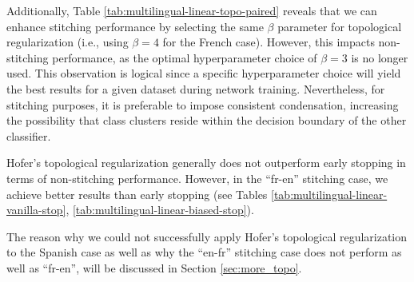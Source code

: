 \documentclass[../main.tex]{subfiles}
\begin{document}
\begin{table}[ht!]
\centering
{}
\caption{Topological reg. w/ matched params (over two random seeds)}
\label{tab:multilingual-linear-topo-paired}
\end{table}

Additionally, Table \ref{tab:multilingual-linear-topo-paired} reveals that we can enhance stitching performance by selecting the same $\beta$ parameter for topological regularization (i.e., using $\beta=4$ for the French case). However, this impacts non-stitching performance, as the optimal hyperparameter choice of $\beta=3$ is no longer used. This observation is logical since a specific hyperparameter choice will yield the best results for a given dataset during network training. Nevertheless, for stitching purposes, it is preferable to impose consistent condensation, increasing the possibility that class clusters reside within the decision boundary of the other classifier.

\begin{mathNote}
Hofer's topological regularization generally does not outperform early stopping in terms of non-stitching performance. However, in the ``fr-en'' stitching case, we achieve better results than early stopping (see Tables \ref{tab:multilingual-linear-vanilla-stop}, \ref{tab:multilingual-linear-biased-stop}).
\end{mathNote}

The reason why we could not successfully apply Hofer's topological regularization to the Spanish case as well as why the ``en-fr'' stitching case does not perform as well as ``fr-en'', will be discussed in Section \ref{sec:more_topo}.\\
\end{document}
